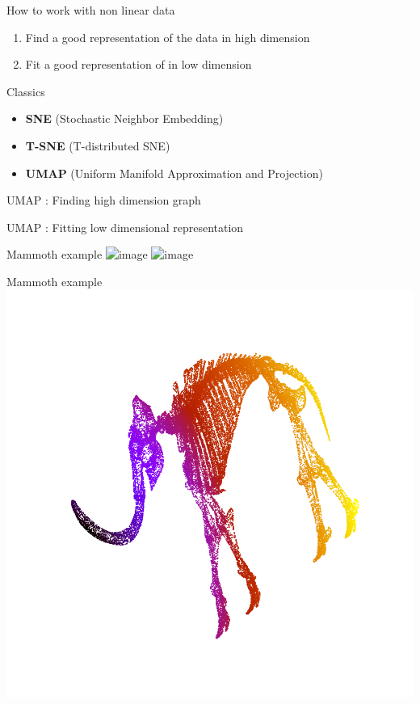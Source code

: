 \documentclass{irdbeamer}
\let\oldcite=\cite
\renewcommand{\cite}[1]{\textcolor[rgb]{.5,.5,.7}{\oldcite{#1}}}
\begin{document}
\begin{frame}{How to work with non linear data}
    \begin{enumerate}
        \item Find a good representation of the data in high dimension
        \item Fit a good representation of in low dimension
    \end{enumerate}
\end{frame}

\begin{frame}{Classics}
    \begin{itemize}
        \item<1->\textbf{SNE} (Stochastic Neighbor Embedding) \cite{hinton2002stochastic}
        \item<2->\textbf{T-SNE} (T-distributed SNE) \cite{van2008visualizing}
        \item<3->\textbf{UMAP} (Uniform Manifold Approximation and Projection) \cite{mcinnes2018umap}
    \end{itemize}
\end{frame}

\begin{frame}{UMAP : Finding high dimension graph}
    
\end{frame}

\begin{frame}{UMAP : Fitting low dimensional representation}
    
\end{frame}

\begin{frame}{Mammoth example}
    \centering
    \vspace{-.5cm}
    \includegraphics<1>[width=.6\textwidth]{./figs/mammoth/3d_single.png}%
    \includegraphics<2>[width=.6\textwidth]{./figs/mammoth/3d_color.png}%
\end{frame}

\begin{frame}{Mammoth example}
    \centering
    \vspace{-.5cm}
    \includegraphics[width=.6\textwidth]{./figs/mammoth/pca.png}
\end{frame}
\end{document}
